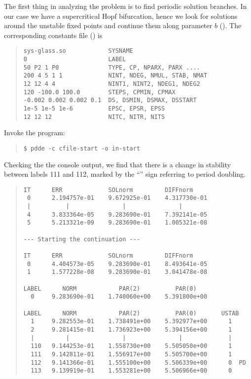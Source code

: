 \documentclass[10pt,a4paper]{ddedoc}
\begin{document}
The first thing in analyzing the problem is to find periodic solution
branches. In our case we have a supercritical Hopf bifurcation, hence we look
for solutions around the unstable fixed points and continue them along
parameter $b$ (). The corresponding constants file () is
{ \small \begin{quote} \begin{lstlisting}[basicstyle=\tt,frame=single]
sys-glass.so            SYSNAME
0                       LABEL
50 P2 1 P0              TYPE, CP, NPARX, PARX ....
200 4 5 1 1             NINT, NDEG, NMUL, STAB, NMAT
12 12 4 4               NINT1, NINT2, NDEG1, NDEG2
120 -100.0 100.0        STEPS, CPMIN, CPMAX
-0.002 0.002 0.002 0.1  DS, DSMIN, DSMAX, DSSTART
1e-5 1e-5 1e-6          EPSC, EPSR, EPSS
12 12 12                NITC, NITR, NITS
\end{lstlisting} \end{quote} } \noindent
Invoke the program:
{ \small \begin{quote} \begin{lstlisting}[basicstyle=\tt,frame=single]
$ pdde -c cfile-start -o in-start
\end{lstlisting} \end{quote} } \noindent
Checking the the console output, we find that there is a change in
stability between labels 111 and 112, marked by the ``'' sign referring to period doubling.
{ \small \begin{quote} \begin{lstlisting}[basicstyle=\tt,frame=single]
IT      ERR             SOLnorm         DIFFnorm
 0      2.194757e-01    9.672925e-01    4.317730e-01
 |          |               |               |
 4      3.833364e-05    9.283690e-01    7.392141e-05
 5      5.213321e-09    9.283690e-01    1.005321e-08

--- Starting the continuation ---

IT      ERR             SOLnorm         DIFFnorm
 0      4.404573e-05    9.283690e-01    8.493641e-05
 1      1.577228e-08    9.283690e-01    3.041478e-08

LABEL      NORM            PAR(2)          PAR(0)
  0     9.283690e-01    1.740060e+00    5.391800e+00

LABEL      NORM            PAR(2)          PAR(0)       USTAB
  1     9.282553e-01    1.738491e+00    5.392977e+00      1
  2     9.281415e-01    1.736923e+00    5.394156e+00      1
  |         |               |               |             |
  110   9.144253e-01    1.558730e+00    5.505050e+00      1
  111   9.142811e-01    1.556917e+00    5.505700e+00      1
  112   9.141366e-01    1.555100e+00    5.506339e+00      0  PD
  113   9.139919e-01    1.553281e+00    5.506966e+00      0
\end{lstlisting} \end{quote} } \noindent
\end{document}
